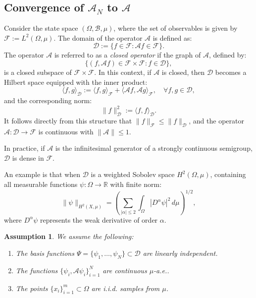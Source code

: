 \documentclass{article}[11]
\newtheorem{assumption}{Assumption}
\begin{document}
\subsection{Convergence of \(\mathcal{A}_N\) to \(\mathcal{A}\)}

Consider the state space \( (\Omega, \mathcal{B}, \mu) \), where the set of observables is given by \( \mathcal{F} := L^2(\Omega, \mu) \). The domain of the operator \( \mathcal{A} \) is defined as:
\[
\mathcal{D} := \{ f \in \mathcal{F} : \mathcal{A} f \in \mathcal{F} \}.
\]
The operator \( \mathcal{A} \) is referred to as a \textit{closed operator} if the graph of \( \mathcal{A} \), defined by:
\[
\{ (f, \mathcal{A} f) \in \mathcal{F} \times \mathcal{F} : f \in \mathcal{D} \},
\]
is a closed subspace of \( \mathcal{F} \times \mathcal{F} \). In this context, if \( \mathcal{A} \) is closed, then \( \mathcal{D} \) becomes a Hilbert space equipped with the inner product:
\[
\langle f, g \rangle_\mathcal{D} := \langle f, g \rangle_{\mathcal{F}} + \langle \mathcal{A} f, \mathcal{A} g \rangle_{\mathcal{F}}, \quad \forall f, g \in \mathcal{D},
\]
and the corresponding norm:
\[
\| f \|_\mathcal{D}^2 := \langle f, f \rangle_\mathcal{D}.
\]
It follows directly from this structure that \( \| f \|_{\mathcal{F}} \leq \| f \|_\mathcal{D} \), and the operator \( \mathcal{A} : \mathcal{D} \to \mathcal{F} \) is continuous with \( \| \mathcal{A} \| \leq 1 \).

In practice, if \( \mathcal{A} \) is the infinitesimal generator of a strongly continuous semigroup, \( \mathcal{D} \) is dense in \( \mathcal{F} \).

An example is that when \( \mathcal{D} \) is a weighted Sobolev space \( H^2(\Omega, \mu) \), containing all measurable functions \( \psi: \Omega \to \mathbb{R} \) with finite norm:
\[
\| \psi \|_{H^2(X, \mu)} = \left( \sum_{|\alpha| \leq 2} \int_\Omega |D^\alpha \psi|^2 \, d\mu \right)^{1/2},
\]
where \( D^\alpha \psi \) represents the weak derivative of order \( \alpha \). 




\begin{assumption}\label{assumption_1}
	We assume the following:
	\begin{enumerate}
		\item The basis functions $\Psi = \{ \psi_1, \dots, \psi_N \} \subset \mathcal{D}$ are linearly independent.
		\item The functions $\{ \psi_i, \mathcal{A} \psi_i \}_{i=1}^N$ are continuous $\mu$-a.e..
		\item The points $\{ x_i \}_{i=1}^m \subset \Omega$ are i.i.d. samples from $\mu$.
	\end{enumerate}
\end{assumption}
\end{document}
